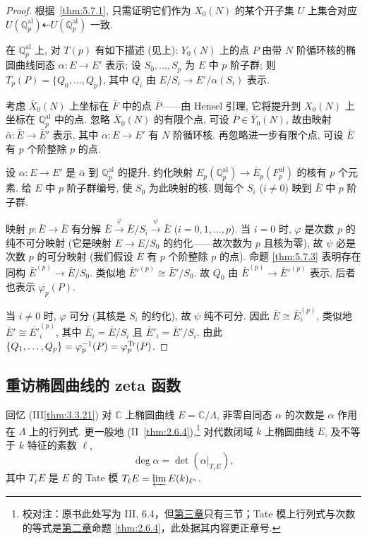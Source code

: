 \begin{proof}
根据~\ref{thm:5.7.1}, 只需证明它们作为 $X_0(N)$ 的某个开子集 $U$ 上集合对应 $U(\mathbb{Q}_p^{\mathrm{al}})\dashleftarrow U(\mathbb{Q}_p^{\mathrm{al}})$ 一致.

在 $\mathbb{Q}_p^{\mathrm{al}}$ 上, 对 $T(p)$ 有如下描述 (见上): $Y_0(N)$ 上的点 $P$ 由带 $N$ 阶循环核的椭圆曲线同态 $\alpha\colon E\to E'$ 表示; 设 $S_0, \dots, S_p$ 为 $E$ 中 $p$ 阶子群; 则 $T_p(P) = \{Q_0, \dots, Q_p\}$, 其中 $Q_i$ 由 $E/S_i\to E'/\alpha(S_i)$ 表示.

考虑 $\bar{X}_0(N)$ 上坐标在 $\bar{F}$ 中的点 $\bar{P}$——由 Hensel 引理, 它将提升到 $X_0(N)$ 上坐标在 $\mathbb{Q}_p^{\mathrm{al}}$ 中的点. 忽略 $\bar{X}_0(N)$ 的有限个点, 可设 $\bar{P}\in\bar{Y}_0(N)$, 故由映射 $\bar{\alpha}\colon\bar{E}\to\bar{E}'$ 表示, 其中 $\alpha\colon E\to E'$ 有 $N$ 阶循环核. 再忽略进一步有限个点, 可设 $\bar{E}$ 有 $p$ 个阶整除 $p$ 的点.

设 $\alpha\colon E\to E'$ 是 $\bar{\alpha}$ 到 $\mathbb{Q}_p^{\mathrm{al}}$ 的提升. 约化映射 $E_p(\mathbb{Q}_p^{\mathrm{al}})\to\bar{E}_p(F_p^{\mathrm{al}})$ 的核有 $p$ 个元素. 给 $E$ 中 $p$ 阶子群编号, 使 $S_0$ 为此映射的核. 则每个 $S_i$ ($i\neq 0$) 映到 $\bar{E}$ 中 $p$ 阶子群.

映射 $p\colon\bar{E}\to\bar{E}$ 有分解 $\bar{E}\xrightarrow{\varphi}\bar{E}/S_i\xrightarrow{\psi}\bar{E}$ ($i = 0, 1, \dots, p$). 当 $i = 0$ 时, $\varphi$ 是次数 $p$ 的纯不可分映射 (它是映射 $E\to E/S_0$ 的约化——故次数为 $p$ 且核为零), 故 $\psi$ 必是次数 $p$ 的可分映射 (我们假设 $\bar{E}$ 有 $p$ 个阶整除 $p$ 的点). 命题 \ref{thm:5.7.3} 表明存在同构 $\bar{E}^{(p)}\to\bar{E}/S_0$. 类似地 $\bar{E}'^{(p)}\cong\bar{E}'/S_0$. 故 $Q_0$ 由 $\bar{E}^{(p)}\to\bar{E}'^{(p)}$ 表示, 后者也表示 $\varphi_p(P)$.

当 $i\neq 0$ 时, $\varphi$ 可分 (其核是 $S_i$ 的约化), 故 $\psi$ 纯不可分. 因此 $\bar{E}\cong\bar{E}_i^{(p)}$, 类似地 $\bar{E}'\cong\overline{E'}_i^{(p)}$, 其中 $\bar{E}_i = \bar{E}/S_i$ 且 $\bar{E}'_i = \bar{E}'/S_i$. 由此 $\{Q_1, \dots, Q_p\} = \varphi_p^{-1}(P) = \varphi_p^{\operatorname{Tr}}(P)$.
\end{proof}

\subsection*{重访椭圆曲线的 zeta 函数}

回忆 (III\ref{thm:3.3.21}) 对 $\mathbb{C}$ 上椭圆曲线 $E = \mathbb{C}/\Lambda$, 非零自同态 $\alpha$ 的次数是 $\alpha$ 作用在 $\Lambda$ 上的行列式. 更一般地 (II~\ref{thm:2.6.4}),\footnote{校对注：原书此处写为 III, 6.4，但\hyperref[ch:3]{第三章}只有三节；Tate 模上行列式与次数的等式是\hyperref[ch:2]{第二章}命题 \ref{thm:2.6.4}，此处据其内容更正章号.} 对代数闭域 $k$ 上椭圆曲线 $E$, 及不等于 $k$ 特征的素数 $\ell$,
\begin{equation} \label{eq:46}
\deg\alpha = \det(\alpha|_{T_\ell E}), \tag{46}
\end{equation}
其中 $T_\ell E$ 是 $E$ 的 Tate 模 $T_\ell E = \varprojlim E(k)_{\ell^n}$.

